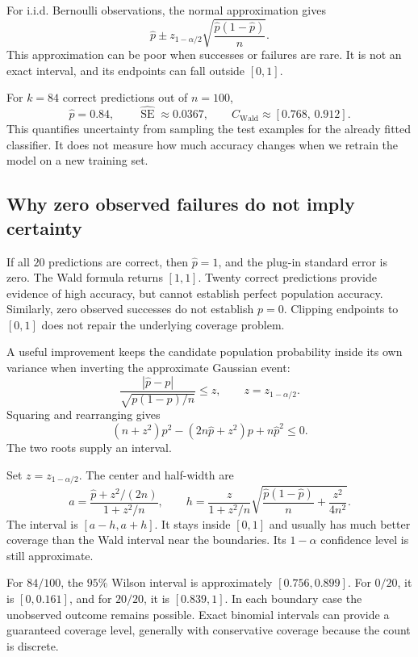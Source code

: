 \begin{result}
For i.i.d. Bernoulli observations, the normal approximation gives
\[
  \widehat p\pm z_{1-\alpha/2}
     \sqrt{\frac{\widehat p(1-\widehat p)}n}.
\]
This approximation can be poor when successes or failures are rare.
It is not an exact interval, and its endpoints can fall outside \([0,1]\).
\end{result}

For \(k=84\) correct predictions out of \(n=100\),
\[
  \widehat p=0.84,\qquad
  \widehat{\operatorname{SE}}\approx0.0367,
  \qquad C_{\mathrm{Wald}}\approx[0.768,\,0.912].
\]
This quantifies uncertainty from sampling the test examples for the
already fitted classifier. It does not measure how much accuracy
changes when we retrain the model on a new training set.

\subsection{Why zero observed failures do not imply certainty}

If all \(20\) predictions are correct, then \(\widehat p=1\), and
the plug-in standard error is zero. The Wald formula returns \([1,1]\).
Twenty correct predictions provide evidence of high accuracy, but
cannot establish perfect population accuracy. Similarly, zero observed
successes do not establish \(p=0\). Clipping endpoints to \([0,1]\)
does not repair the underlying coverage problem.

A useful improvement keeps the candidate population probability
inside its own variance when inverting the approximate Gaussian event:
\[
  \frac{|\widehat p-p|}{\sqrt{p(1-p)/n}}\le z,
  \qquad z=z_{1-\alpha/2}.
\]
Squaring and rearranging gives
\[
  (n+z^2)p^2-(2n\widehat p+z^2)p+n\widehat p^2\le0.
\]
The two roots supply an interval.

\begin{result}
Set \(z=z_{1-\alpha/2}\). The center and half-width are
\[
  a=\frac{\widehat p+z^2/(2n)}{1+z^2/n},\qquad
  h=\frac{z}{1+z^2/n}
       \sqrt{\frac{\widehat p(1-\widehat p)}n+\frac{z^2}{4n^2}}.
\]
The interval is \([a-h,a+h]\). It stays inside \([0,1]\) and usually
has much better coverage than the Wald interval near the boundaries.
Its \(1-\alpha\) confidence level is still approximate.
\end{result}

For \(84/100\), the \(95\%\) Wilson interval is approximately
\([0.756,0.899]\). For \(0/20\), it is \([0,0.161]\), and for
\(20/20\), it is \([0.839,1]\). In each boundary case the unobserved
outcome remains possible. Exact binomial intervals can provide a
guaranteed coverage level, generally with conservative coverage because
the count is discrete.

